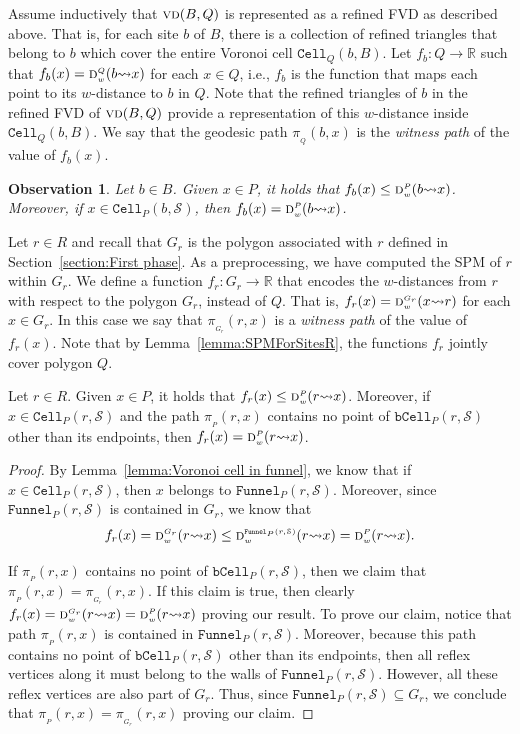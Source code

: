 \documentclass[a4paper,UKenglish]{socg-lipics-v2018}
\newtheorem{observation}[theorem]{Observation}
\newcommand{\s}{\mathcal S}
\newcommand{\dd}[3][P]{\ensuremath{\textsc{d}_{\scriptscriptstyle w}^{\scriptscriptstyle #1}(#2 {\leadsto} #3)}}
\newcommand{\p}[3][P]{\ensuremath{\pi_{_{#1}}(#2, #3)}}
\newcommand{\funnel}[2][P]{\ensuremath{\mathtt{Funnel}_{\scriptscriptstyle #1}(#2)}}
\newcommand{\cell}[2][P]{\ensuremath{\mathtt{Cell}_{\scriptscriptstyle #1}(#2)}}
\newcommand{\bcell}[2][P]{\ensuremath{\mathtt{bCell}_{\scriptscriptstyle #1}(#2)}}
\newcommand{\vd}[2][P]{\textsc{vd}(#2, #1)}
\begin{document}
Assume inductively that $\vd[Q]{B}$ is represented as a refined FVD as described above.
That is, for each site $b$ of $B$, there is a collection of refined triangles that belong to $b$ which cover the entire Voronoi cell $\cell[Q]{b, B}$. 
Let $f_b:Q \to \mathbb{R}$ such that $f_b(x) = \dd[Q]{b}{x}$ for each $x\in Q$, i.e., $f_b$ is the function that maps each point to its $w$-distance to $b$ in $Q$. 
Note that the refined triangles of $b$ in the refined FVD of $\vd[Q]{B}$ provide a representation of this $w$-distance inside $\cell[Q]{b, B}$.
We say that the geodesic path $\p[Q]{b}{x}$ is the \emph{witness path} of the value of $f_b(x)$.

\begin{observation}\label{obs: f_s and distance coincide in cell}
Let $b\in B$.
Given $x\in P$, it holds that $f_b(x) \leq \dd{b}{x}$. Moreover, if $x\in \cell{b, \s}$, then $f_b(x) = \dd{b}{x}$. 
\end{observation}

Let $r\in R$ and recall that $G_r$ is the polygon associated with $r$ defined in Section~\ref{section:First phase}. 
As a preprocessing, we have computed the SPM of $r$ within $G_r$.
We define a function $f_r:G_r\to \mathbb{R}$ that encodes the $w$-distances from $r$ with respect to the polygon $G_r$, instead of $Q$. 
That is, $f_r(x) = \dd[G_r]{x}{r}$ for each $x\in G_r$.
In this case we say that $\p[G_r]{r}{x}$ is a \emph{witness path} of the value of $f_r(x)$. 
Note that by Lemma~\ref{lemma:SPMForSitesR}, the functions $f_r$ jointly cover polygon $Q$. 

\begin{lemma}\label{lemma: f_r and distance coincide in cell}
Let $r\in R$.
Given $x\in P$, it holds that $f_r(x) \leq \dd{r}{x}$. Moreover, if $x\in \cell{r, \s}$ and the path $\p{r}{x}$ contains no point of $\bcell{r, \s}$ other than its endpoints, then $f_r(x) = \dd{r}{x}$. 
\end{lemma}
\begin{proof}
By Lemma~\ref{lemma:Voronoi cell in funnel}, we know that if $x\in \cell{r,\s}$, then  $x$ belongs to $\funnel{r, \s}$.
Moreover, since $\funnel{r, \s}$ is contained in $G_r$, we know that 
\[ f_r(x) = \dd[G_r]{r}{x} \leq \dd[\funnel{r, \s}]{r}{x} = \dd{r}{x}.\]

If $\p{r}{x}$ contains no point of $\bcell{r, \s}$, then we claim that $\p{r}{x} = \p[G_r]{r}{x}$. 
If this claim is true, then clearly $f_r(x) = \dd[G_r]{r}{x} = \dd{r}{x}$ proving our result.
To prove our claim, notice that path $\p{r}{x}$ is contained in $\funnel{r, \s}$. Moreover, because this path contains no point of $\bcell{r, \s}$ other than its endpoints, then all reflex vertices along it must belong to the walls of $\funnel{r, \s}$. However, all these reflex vertices are also part of $G_r$. Thus, since $\funnel{r, \s}\subseteq G_r$, we conclude that $\p{r}{x} = \p[G_r]{r}{x}$ proving our claim.  
\end{proof}
\end{document}
